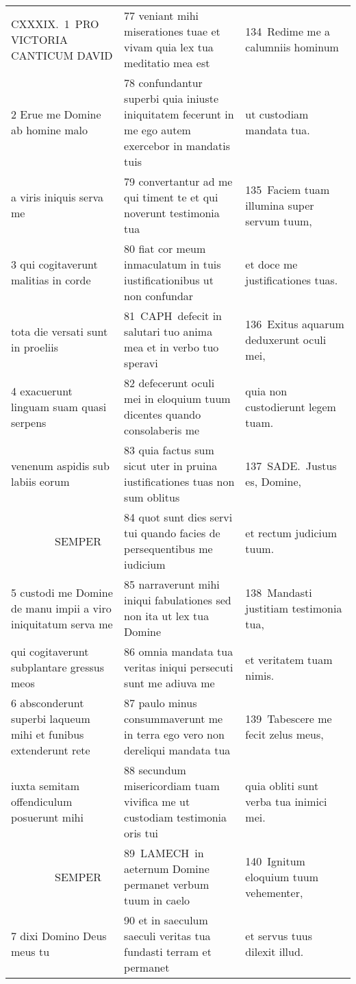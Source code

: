 \documentclass{article}
\begin{document}
\begin{longtable}{@{}p{}p{}p{}@{}}
CXXXIX. 1 PRO VICTORIA CANTICUM DAVID	&	77 veniant mihi miserationes tuae et vivam quia lex tua meditatio mea est	&	134 Redime me a calumniis hominum	\\
2 Erue me Domine ab homine malo	&	78 confundantur superbi quia iniuste iniquitatem fecerunt in me ego autem exercebor in mandatis tuis	&	ut custodiam mandata tua.	\\
a viris iniquis serva me	&	79 convertantur ad me qui timent te et qui noverunt testimonia tua	&	135 Faciem tuam illumina super servum tuum,	\\
3 qui cogitaverunt malitias in corde	&	80 fiat cor meum inmaculatum in tuis iustificationibus ut non confundar	&	et doce me justificationes tuas.	\\
tota die versati sunt in proeliis	&	81 CAPH defecit in salutari tuo anima mea et in verbo tuo speravi	&	136 Exitus aquarum deduxerunt oculi mei,	\\
4 exacuerunt linguam suam quasi serpens	&	82 defecerunt oculi mei in eloquium tuum dicentes quando consolaberis me	&	quia non custodierunt legem tuam.	\\
venenum aspidis sub labiis eorum	&	83 quia factus sum sicut uter in pruina iustificationes tuas non sum oblitus	&	137 SADE. Justus es, Domine,	\\
    SEMPER	&	84 quot sunt dies servi tui quando facies de persequentibus me iudicium	&	et rectum judicium tuum.	\\
5 custodi me Domine de manu impii a viro iniquitatum serva me	&	85 narraverunt mihi iniqui fabulationes sed non ita ut lex tua Domine	&	138 Mandasti justitiam testimonia tua,	\\
qui cogitaverunt subplantare gressus meos	&	86 omnia mandata tua veritas iniqui persecuti sunt me adiuva me	&	et veritatem tuam nimis.	\\
6 absconderunt superbi laqueum mihi et funibus extenderunt rete	&	87 paulo minus consummaverunt me in terra ego vero non dereliqui mandata tua	&	139 Tabescere me fecit zelus meus,	\\
iuxta semitam offendiculum posuerunt mihi	&	88 secundum misericordiam tuam vivifica me ut custodiam testimonia oris tui	&	quia obliti sunt verba tua inimici mei.	\\
    SEMPER	&	89 LAMECH in aeternum Domine permanet verbum tuum in caelo	&	140 Ignitum eloquium tuum vehementer,	\\
7 dixi Domino Deus meus tu	&	90 et in saeculum saeculi veritas tua fundasti terram et permanet	&	et servus tuus dilexit illud.	\\

\end{longtable}
\end{document}
